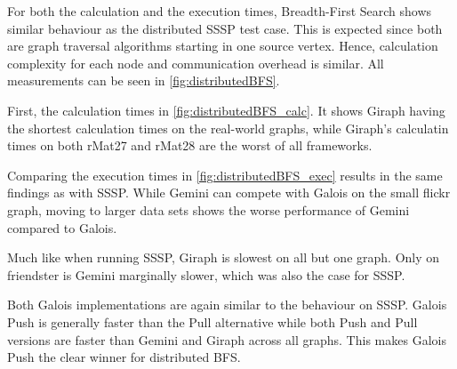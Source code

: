 For both the calculation and the execution times, Breadth-First Search shows similar behaviour as the distributed SSSP test case. This is expected since both are graph traversal algorithms starting in one source vertex.
Hence, calculation complexity for each node and communication overhead is similar.
All measurements can be seen in \autoref{fig:distributedBFS}.

First, the calculation times in \autoref{fig:distributedBFS_calc}. It shows Giraph having the shortest calculation times on the real-world graphs, while Giraph's calculatin times on both rMat27 and rMat28 are the worst of all frameworks. 

Comparing the execution times in \autoref{fig:distributedBFS_exec} results in the same findings as with SSSP. 
While Gemini can compete with Galois on the small flickr graph, moving to larger data sets shows the worse performance of Gemini compared to Galois.

Much like when running SSSP, Giraph is slowest on all but one graph. Only on friendster is Gemini marginally slower, which was also the case for SSSP.

Both Galois implementations are again similar to the behaviour on SSSP.
Galois Push is generally faster than the Pull alternative while both Push and Pull versions are faster than Gemini and Giraph across all graphs.
This makes Galois Push the clear winner for distributed BFS.

